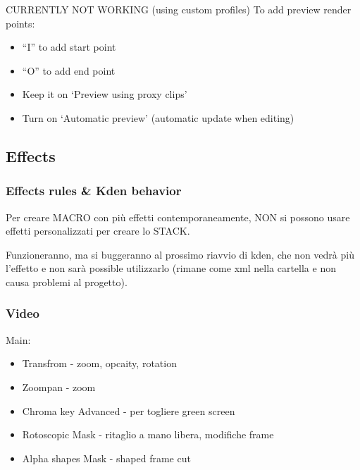 \documentclass[12pt]{article}
\begin{document}
CURRENTLY NOT WORKING (using custom profiles)
To add preview render points:
\begin{itemize}
    \item ``I'' to add start point
    \item ``O'' to add end point  
    \item Keep it on `Preview using proxy clips'
    \item Turn on `Automatic preview' (automatic update when editing)
\end{itemize}









\clearpage{}
\subsection{Effects}

\vspace{10px}

\subsubsection{Effects rules \& Kden behavior}
\begin{center}
    Per creare MACRO con più effetti contemporaneamente, {\color{red}NON} si possono usare effetti personalizzati per creare lo STACK.    
\end{center}
Funzioneranno, ma si buggeranno al prossimo riavvio di kden, che non vedrà più l'effetto e non sarà possible utilizzarlo (rimane come xml nella cartella e non causa problemi al progetto).



\vspace{20px}



\subsubsection{Video}

Main:
\begin{itemize}
    \item Transfrom - zoom, opcaity, rotation
    \item Zoompan - zoom
    \item Chroma key Advanced - per togliere green screen
    \item Rotoscopic Mask -  ritaglio a mano libera, modifiche frame 
    \item Alpha shapes Mask - shaped frame cut
\end{itemize}
\end{document}
